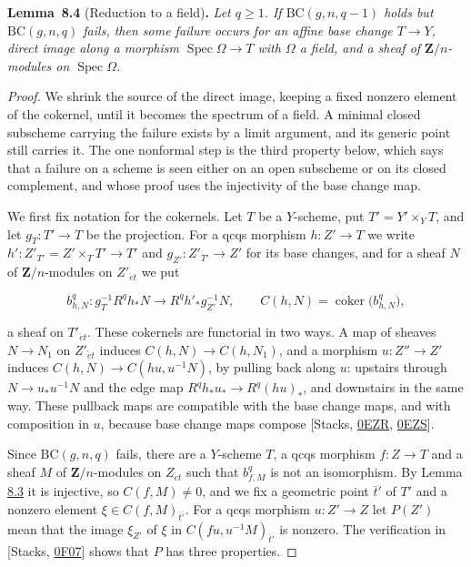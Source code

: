 \documentclass[11pt]{article}
\newenvironment{bpstatement}[2]{\par\addvspace{0.6\baselineskip}\noindent\textbf{#1}#2\textbf{.}\enspace\ignorespaces}
  {\par\addvspace{0.4\baselineskip}}
\newenvironment{bpstatementit}[2]{\begin{bpstatement}{#1}{#2}\itshape\ignorespaces}{\end{bpstatement}}
\begin{document}
\label{bp656}%
\begin{bpstatementit}{Lemma~8.4}{ (Reduction to a field)}
Let \(q\geq1\). If \(\mathrm{BC}(g,n,q-1)\) holds but \(\mathrm{BC}(g,n,q)\) fails, then some failure occurs for an affine base change \(T\to Y\), direct image along a morphism \(\operatorname{Spec}\Omega\to T\) with \(\Omega\) a field, and a sheaf of \(\mathbf Z/n\)-modules on \(\operatorname{Spec}\Omega\).
\end{bpstatementit}

\begin{proof}[{Proof}]\label{bp657}%
We shrink the source of the direct image, keeping a fixed nonzero element of the cokernel, until it becomes the spectrum of a field. A minimal closed subscheme carrying the failure exists by a limit argument, and its generic point still carries it. The one nonformal step is the third property below, which says that a failure on a scheme is seen either on an open subscheme or on its closed complement, and whose proof uses the injectivity of the base change map.

We first fix notation for the cokernels. Let \(T\) be a \(Y\)-scheme, put \(T'=Y'\times_YT\), and let \(g_T:T'\to T\) be the projection. For a qcqs morphism \(h:Z'\to T\) we write \(h':Z'_{T'}=Z'\times_TT'\to T'\) and \(g_{Z'}:Z'_{T'}\to Z'\) for its base changes, and for a sheaf \(N\) of \(\mathbf Z/n\)-modules on \(Z'_{\acute{e}t}\) we put

\[
b^q_{h,N}:g_T^{-1}R^qh_*N\longrightarrow R^qh'_*g_{Z'}^{-1}N,
\qquad
C(h,N)=\operatorname{coker}\bigl(b^q_{h,N}\bigr),
\]

a sheaf on \(T'_{\acute{e}t}\). These cokernels are functorial in two ways. A map of sheaves \(N\to N_1\) on \(Z'_{\acute{e}t}\) induces \(C(h,N)\to C(h,N_1)\), and a morphism \(u:Z''\to Z'\) induces \(C(h,N)\to C(hu,u^{-1}N)\), by pulling back along \(u\): upstairs through \(N\to u_*u^{-1}N\) and the edge map \(R^qh_*u_*\to R^q(hu)_*\), and downstairs in the same way. These pullback maps are compatible with the base change maps, and with composition in \(u\), because base change maps compose [Stacks, \href{https://stacks.math.columbia.edu/tag/0EZR}{0EZR}, \href{https://stacks.math.columbia.edu/tag/0EZS}{0EZS}].

Since \(\mathrm{BC}(g,n,q)\) fails, there are a \(Y\)-scheme \(T\), a qcqs morphism \(f:Z\to T\) and a sheaf \(M\) of \(\mathbf Z/n\)-modules on \(Z_{\acute{e}t}\) such that \(b^q_{f,M}\) is not an isomorphism. By Lemma \hyperref[bp653]{8.3} it is injective, so \(C(f,M)\neq0\), and we fix a geometric point \(\bar t'\) of \(T'\) and a nonzero element \(\xi\in C(f,M)_{\bar t'}\). For a qcqs morphism \(u:Z'\to Z\) let \(P(Z')\) mean that the image \(\xi_{Z'}\) of \(\xi\) in \(C(fu,u^{-1}M)_{\bar t'}\) is nonzero. The verification in [Stacks, \href{https://stacks.math.columbia.edu/tag/0F07}{0F07}] shows that \(P\) has three properties.


\end{proof}
\end{document}
